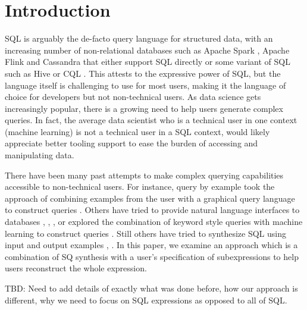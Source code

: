 \section{Introduction}

SQL is arguably the de-facto query language for structured data, with an increasing number of non-relational databases such as Apache Spark \cite{Apache_Spark}, Apache Flink \cite{Apache_Flink} and Cassandra \cite{Cassandra} that either support SQL directly or some variant of SQL such as Hive \cite{Hive} or CQL \cite{CQL}. This attests to the expressive power of SQL, but the language itself is challenging to use for most users, making it the language of choice for developers but not non-technical users.  As data science gets increasingly popular, there is a growing need to help users generate complex queries.  In fact, the average data scientist who is a technical user in one context (machine learning) is not a technical user in a SQL context, would likely appreciate better tooling support to ease the burden of accessing and manipulating data.

There have been many past attempts to make complex querying capabilities accessible to non-technical users.  For instance, query by example took the approach of combining examples from the user with a graphical query language to construct queries \cite{Zloof}.  Others have tried to provide natural language interfaces to databases \cite{Fei-Li}, \cite{Androutsopoulos}, \cite{Seq2SQL}, or explored the combination of keyword style queries with machine learning to construct queries \cite{Bergamaschi}.  Still others have tried to synthesize SQL using input and output examples \cite{BodikPLDI}, \cite{BodikSIGMOD}.  In this paper, we examine an approach which is a combination of SQ synthesis with a user's specification of subexpressions to help users reconstruct the whole expression.  

TBD: Need to add details of exactly what was done before, how our approach is different, why we need to focus on SQL expressions as opposed to all of SQL.

